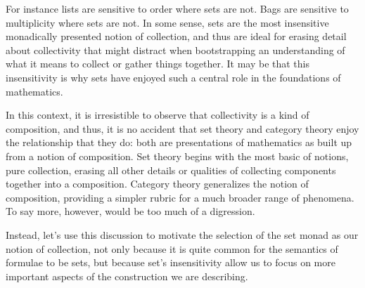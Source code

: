 \documentclass[]{acm_proc_article-sp}
\numberwithin{equation}{subsection}
\begin{document}
For instance lists are sensitive to order where sets are not. Bags are
sensitive to multiplicity where sets are not. In some sense, sets are
the most insensitive monadically presented notion of collection, and
thus are ideal for erasing detail about collectivity that might
distract when bootstrapping an understanding of what it means to
collect or gather things together. It may be that this insensitivity
is why sets have enjoyed such a central role in the foundations of
mathematics.

In this context, it is irresistible to observe that collectivity is a
kind of composition, and thus, it is no accident that set theory and
category theory enjoy the relationship that they do: both are
presentations of mathematics as built up from a notion of
composition. Set theory begins with the most basic of notions, pure
collection, erasing all other details or qualities of collecting
components together into a composition. Category theory generalizes
the notion of composition, providing a simpler rubric for a much
broader range of phenomena. To say more, however, would be too much of
a digression.

Instead, let's use this discussion to motivate the selection of the
set monad as our notion of collection, not only because it is quite
common for the semantics of formulae to be sets, but because set's
insensitivity allow us to focus on more important aspects of the
construction we are describing.
\end{document}

